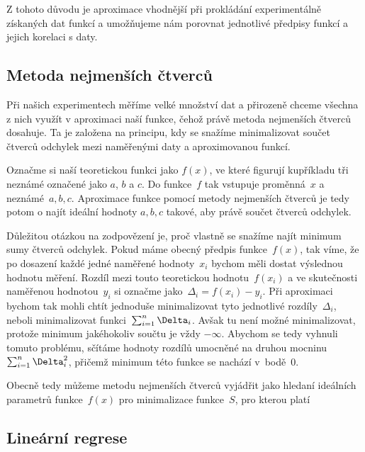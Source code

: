 Z tohoto důvodu je aproximace vhodnější při prokládání experimentálně získaných
dat funkcí a umožňujeme nám porovnat jednotlivé předpisy funkcí a jejich
korelaci s daty.

\subsection{Metoda nejmenších čtverců}
Při našich experimentech měříme velké množství dat a přirozeně chceme všechna
z nich využít v aproximaci naší funkce, čehož právě metoda nejmenších čtverců
dosahuje. Ta je založena na principu, kdy se snažíme minimalizovat součet
čtverců odchylek mezi naměřenými daty a aproximovanou funkcí.

Označme si naší teoretickou funkci jako $f(x)$, ve které figurují kupříkladu
tři neznámé označené jako $a$, $b$ a $c$. Do funkce~$f$ tak vstupuje
proměnná~$x$ a neznámé~$a,b,c$. Aproximace funkce pomocí metody nejmenších
čtverců je tedy potom o najít ideální hodnoty $a,b,c$ takové, aby právě součet
čtverců odchylek.

Důležitou otázkou na zodpovězení je, proč vlastně se snažíme najít minimum sumy
čtverců odchylek. Pokud máme obecný předpis funkce~$f(x)$, tak víme, že po
dosazení každé jedné naměřené hodnoty~$x_i$ bychom měli dostat výslednou
hodnotu měření. Rozdíl mezi touto teoretickou hodnotu~$f(x_i)$ a ve skutečnosti
naměřenou hodnotou~$y_i$ si označme jako~$\Delta_i = f(x_i)-y_i$. Při
aproximaci bychom tak mohli chtít jednoduše minimalizovat tyto jednotlivé
rozdíly~$\Delta_i$, neboli minimalizovat funkci~$\nsum \Delta_i$. Avšak tu není
možné minimalizovat, protože minimum jakéhokoliv součtu je vždy $-\infty$.
Abychom se tedy vyhnuli tomuto problému, sčítáme hodnoty rozdílů umocněné na
druhou mocninu~$\nsum \Delta_i^2$, přičemž minimum této funkce se nachází
v~bodě~$0$.

Obecně tedy můžeme metodu nejmenších čtverců vyjádřit jako hledaní ideálních 
parametrů funkce~$f(x)$ pro minimalizace funkce~$S$, pro kterou platí


\subsection{Lineární regrese}

